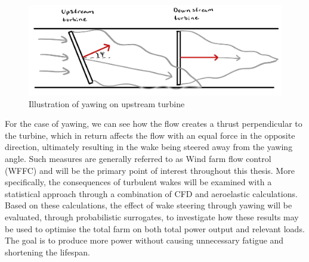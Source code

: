 \begin{figure}[H]
    \centering
    \includegraphics[scale=0.22]{Illustrations/Yaw_illu.jpg}
    \caption{Illustration of yawing on upstream turbine}
    \label{fig:yawingillu}
\end{figure}


For the case of yawing, we can see how the flow creates a thrust perpendicular to the turbine, which in return affects the flow with an equal force in the opposite direction, ultimately resulting in the wake being steered away from the yawing angle. Such measures are generally referred to as Wind farm flow control (WFFC) and will be the primary point of interest throughout this thesis. More specifically, the consequences of turbulent wakes will be examined with a statistical approach through a combination of CFD and aeroelastic calculations. Based on these calculations, the effect of wake steering through yawing will be evaluated, through probabilistic surrogates, to investigate how these results may be used to optimise the total farm on both total power output and relevant loads. The goal is to produce more power without causing unnecessary fatigue and shortening the lifespan. 
